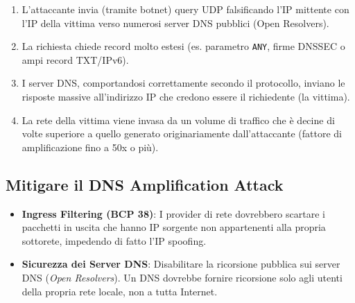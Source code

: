 \begin{enumerate}
    \item L'attaccante invia (tramite botnet) query UDP falsificando l'IP mittente con l'IP della vittima verso numerosi server DNS pubblici (Open Resolvers).
    \item La richiesta chiede record molto estesi (es. parametro \texttt{ANY}, firme DNSSEC o ampi record TXT/IPv6).
    \item I server DNS, comportandosi correttamente secondo il protocollo, inviano le risposte massive all'indirizzo IP che credono essere il richiedente (la vittima).
    \item La rete della vittima viene invasa da un volume di traffico che è decine di volte superiore a quello generato originariamente dall'attaccante (fattore di amplificazione fino a 50x o più).
\end{enumerate}

\subsection{Mitigare il DNS Amplification Attack}
\begin{itemize}
    \item \textbf{Ingress Filtering (BCP 38)}: I provider di rete dovrebbero scartare i pacchetti in uscita che hanno IP sorgente non appartenenti alla propria sottorete, impedendo di fatto l'IP spoofing.
    \item \textbf{Sicurezza dei Server DNS}: Disabilitare la ricorsione pubblica sui server DNS (\textit{Open Resolvers}). Un DNS dovrebbe fornire ricorsione solo agli utenti della propria rete locale, non a tutta Internet.
\end{itemize}
